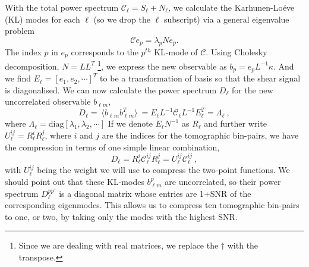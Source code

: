 \documentclass[twocolumn,nofootinbib]{\docclass}
\newcommand\be{\begin{equation}}
\newcommand\ee{\end{equation}}
\newcommand\ctot{\mathcal{C}}
\begin{document}
	With the total power spectrum $\ctot_\ell = S_\ell+N_\ell$, we calculate the Karhunen-Lo\'eve (KL) modes for each $\ell$ (so we drop the $\ell$ subscript) via a general eigenvalue problem 
	\be
	\ctot e_p = \lambda_p N e_p
	.\ee
	The index $p$ in $e_p$ corresponds to the $p^{th}$ KL-mode of $\ctot$. Using Cholesky decomposition, $N = L L^T$ \footnote{Since we are dealing with real matrices, we replace the $\dagger$ with the transpose.}, we express the new observable as $b_p = e_p  L^{-1} \kappa$.
	And we find $E_{\ell} = [e_1, e_2, \cdots] ^T$ to be a transformation of basis so that the shear signal is diagonalised. We can now calculate the power spectrum $D_{\ell}$ for the new uncorrelated observable $b_{\ell m}$,
	\be
	D_{\ell}=\ \langle b_{\ell m} b_{\ell m}^T \rangle \ = E_{\ell} L^{-1} \ctot_{\ell} L^{-1} E^{T}_{\ell} = \Lambda_{\ell}\
	,\ee
	where $\Lambda_{\ell} = \text{diag}[\lambda_1, \lambda_2, \cdots]$ If we denote $E_{\ell} N^{-1}$ as $R_{\ell}$ and further write $U_{\ell}^{ij}=R^i_{\ell} R^j_{\ell}$, where $i$ and $j$ are the indices for the tomographic bin-pairs, we have the compression in terms of one simple linear combination,%
	\be
	D_{\ell} = R_{\ell}^i \ctot_{\ell}^{ij} R_{\ell}^j = U_{\ell}^{ij} \ctot_{\ell}^{ij}\
	,\ee
	with $U_{\ell}^{ij}$ being the weight we will use to compress the two-point functions. We should point out that these KL-modes $b_{\ell m}^p$ are uncorrelated, so their power spectrum $D_{\ell}^{pp'}$ is a diagonal matrix whose entries are 1+SNR of the corresponding eigenmodes. This allows us to compress ten tomographic bin-pairs to one, or two, by taking only the modes with the highest SNR. %
\end{document}
